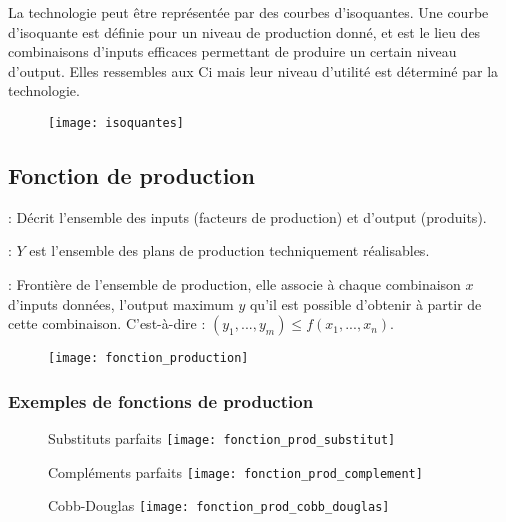 La technologie peut être représentée par des courbes d'isoquantes. Une courbe d'isoquante est définie pour un niveau de production donné, et est le lieu des combinaisons d'inputs efficaces permettant de produire un certain niveau d'output. Elles ressembles aux Ci mais leur niveau d'utilité est déterminé par la technologie.
\begin{figure}[H]
	\centering
	\texttt{[image: isoquantes]}
\end{figure}

\newpage
\subsection{Fonction de production}

 : Décrit l'ensemble des inputs (facteurs de production) et d'output (produits).

 : $Y$ est l'ensemble des plans de production techniquement réalisables.

 : Frontière de l'ensemble de production, elle associe à chaque combinaison $x$ d'inputs données, l'output maximum $y$ qu'il est possible d'obtenir à partir de cette combinaison. C'est-à-dire : $(y_1, ..., y_m) \leq f(x_1, ..., x_n)$.

\begin{figure}[H]
	\centering
	\texttt{[image: fonction\_production]}
\end{figure}

\subsubsection{Exemples de fonctions de production}


\begin{minipage}{0.33\textwidth}
	\begin{figure}[H]
		\centering
		Substituts parfaits
		\texttt{[image: fonction\_prod\_substitut]}
	\end{figure}
\end{minipage}
\begin{minipage}{0.33\textwidth}
	\begin{figure}[H]
		\centering
		Compléments parfaits
		\texttt{[image: fonction\_prod\_complement]}
	\end{figure}
\end{minipage}
\begin{minipage}{0.33\textwidth}
	\begin{figure}[H]
		\centering
		Cobb-Douglas
		\texttt{[image: fonction\_prod\_cobb\_douglas]}
	\end{figure}
\end{minipage}

